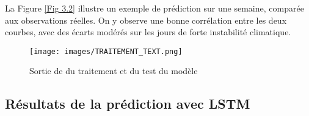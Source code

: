 \documentclass[a4paper,12pt,openany]{report}
\begin{document}
\quad La Figure \ref{Fig 3.2} illustre un exemple de prédiction sur une semaine, comparée aux observations réelles. On y observe une bonne corrélation entre les deux courbes, avec des écarts modérés sur les jours de forte instabilité climatique. 

\begin{figure}[H]
	\begin{center}
		 \begin{minipage}{\textwidth}
		    \begin{center}
		    \texttt{[image: images/TRAITEMENT\_TEXT.png]}
		    \end{center}
		    \end{minipage}
		\caption{Sortie de du traitement et du test du modèle \label{Fig 3.1}}
	\end{center}
\end{figure}

\subsection{Résultats de la prédiction avec LSTM}
\end{document}
